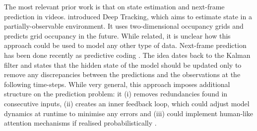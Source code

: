         The most relevant prior work is that on state estimation and next-frame prediction in videos. \cite{Ondruska2016} introduced Deep Tracking, which aims to estimate state in a partially-observable environment. It uses two-dimensional occupancy grids and predicts grid occupancy in the future. While related, it is unclear how this approach could be used to model any other type of data. Next-frame prediction has been done recently as predictive coding \citep{Lotter2016, Canziani2017}. The idea dates back to the Kalman filter \citep{Kalman1960} and states that the hidden state of the model should be updated only to remove any discrepancies between the predictions and the observations at the following time-steps. While very general, this approach imposes additional structure on the prediction problem: it (i) removes redundancies found in consecutive inputs, (ii) creates an inner feedback loop, which could adjust model dynamics at runtime to minimise any errors and (iii) could implement human-like attention mechanisms if realised probabilistically \citep{Friston2009guide}. 
    
  
%
%
